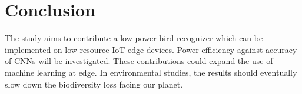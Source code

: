 
\chapter{Conclusion}

The study aims to contribute a low-power bird recognizer which can be implemented on low-resource IoT edge devices. 
Power-efficiency against accuracy of CNNs will be investigated.
These contributions could expand the use of machine learning at edge.
In environmental studies, the results should eventually slow down the biodiversity loss facing our planet.
